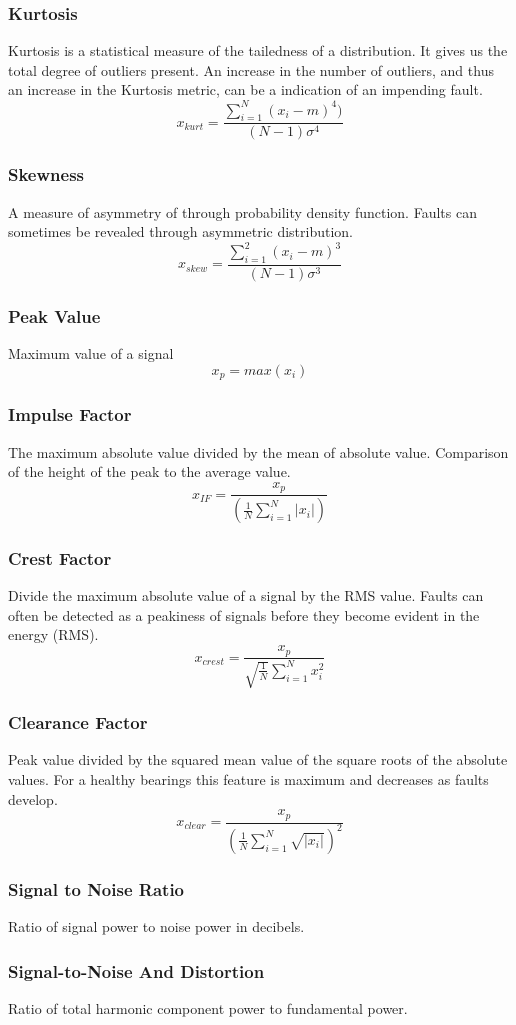 \documentclass{article}
\begin{document}
\subsubsection{Kurtosis}
Kurtosis is a statistical measure of the tailedness of a distribution. It gives us the total degree of outliers present. An increase in the number of outliers, and thus an increase in the Kurtosis metric, can be a indication of an impending fault.
$$ x_{kurt} = \frac{\sum^N_{i=1}(x_i-m)^4)}{(N-1)\sigma^4} $$ 
\subsubsection{Skewness} 
A measure of asymmetry of through probability density function. Faults can sometimes be revealed through asymmetric distribution.
$$ x_{skew} = \frac{\sum^2_{i=1}(x_i-m)^3}{(N-1)\sigma^3} $$
\subsubsection{Peak Value}
Maximum value of a signal
$$ x_p = max(x_i) $$ 
\subsubsection{Impulse Factor} 
The maximum absolute value divided by the mean of absolute value. Comparison of the height of the peak to the average value.
$$ x_{IF} = \frac{x_p}{(\frac{1}{N}\sum^N_{i=1}|x_i|)} $$  
\subsubsection{Crest Factor} 
Divide the maximum absolute value of a signal by the RMS value.
Faults can often be detected as a peakiness of signals before they become evident in the energy (RMS).
$$ x_{crest} = \frac{x_p}{\sqrt{\frac{1}{N}}\sum^N_{i=1}x^2_i} $$
\subsubsection{Clearance Factor} 
Peak value divided by the squared mean value of the square roots of the absolute values. For a healthy bearings this feature is maximum and decreases as faults develop.
$$ x_{clear} = \frac{x_p}{(\frac{1}{N}\sum^N_{i=1}\sqrt{|x_i|})^2} $$
\subsubsection{Signal to Noise Ratio}
Ratio of signal power to noise power in decibels.
\subsubsection{Signal-to-Noise And Distortion}
Ratio of total harmonic component power to fundamental power.
\end{document}
